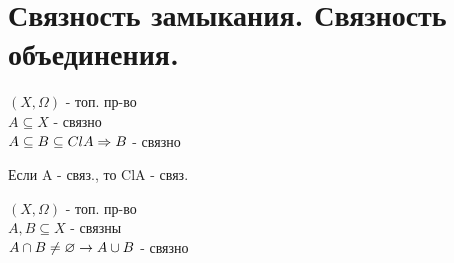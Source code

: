 \documentclass[geometry.tex]{subfiles}
\begin{document}
  \section{Связность замыкания. Связность объединения.}

  \begin{theorem}
      $(X, \Omega)$ - топ. пр-во\\
      $A \subseteq X$ - связно\\
      $A \subseteq B \subseteq Cl A\\ \Rightarrow B$ - связно
  \end{theorem}

  \begin{theorem}
      Если A - связ., то ClA - связ.
  \end{theorem}

  \begin{theorem}
      $(X, \Omega)$ - топ. пр-во\\
      $A, B \subseteq X$ - связны\\
      $A \cap B \neq \varnothing\\ \rightarrow A \cup B $ - связно
  \end{theorem}
\end{document}

